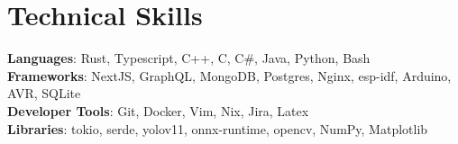 \documentclass[letterpaper,11pt]{article}
\begin{document}
%
\section{Technical Skills}
 \begin{itemize}[leftmargin=0.15in, label={}]
    \small{\item{
     \textbf{Languages}{: Rust, Typescript, C++, C, C\#, Java, Python, Bash} \\
     \textbf{Frameworks}{: NextJS, GraphQL, MongoDB, Postgres, Nginx, esp-idf, Arduino, AVR, SQLite} \\
     \textbf{Developer Tools}{: Git, Docker, Vim, Nix, Jira, Latex} \\
     \textbf{Libraries}{: tokio, serde, yolov11, onnx-runtime, opencv, NumPy, Matplotlib}
    }}
 \end{itemize}


\end{document}
